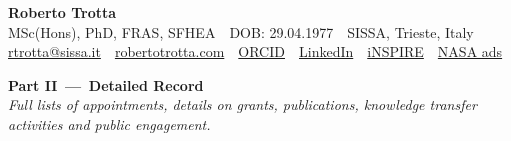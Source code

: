 \documentclass[10pt, a4paper]{article}
\begin{document}
\begin{center}
{\LARGE\bfseries\color{cvaccent} Roberto Trotta}\\[0.3em]
{\small MSc(Hons), PhD, FRAS, SFHEA \,\textbar\, DOB: 29.04.1977 \,\textbar\, SISSA, Trieste, Italy}\\[0.25em]
{\small \href{mailto:rtrotta@sissa.it}{rtrotta@sissa.it} \,\textbar\,
        \href{http://robertotrotta.com}{robertotrotta.com} \,\textbar\,
        \href{https://orcid.org/0000-0002-3415-0707}{ORCID} \,\textbar\,
        \href{https://www.linkedin.com/in/robertotrotta/}{LinkedIn} \,\textbar\,
        \href{https://inspirehep.net/literature?sort=mostrecent&size=25&page=1&q=a%20R.Trotta.1&ui-citation-summary=true}{iNSPIRE} \,\textbar\,
	\href{https://ui.adsabs.harvard.edu/search/q=orcid%3A0000-0002-3415-0707&sort=date%20desc%2C%20bibcode%20desc&p_=0}{NASA ads}
}
\end{center}



\clearpage

\begin{center}
\vspace*{-0.4em}
{\color{cvaccent}\bfseries\large Part II \,---\, Detailed Record}\\[0.4em]
{\itshape\small Full lists of appointments, details on grants, publications, knowledge transfer activities and public engagement.}
\end{center}
\vspace{0.5em}

\begingroup
\small
\setlength{\datebox}{2.2cm}%








\endgroup
\end{document}
